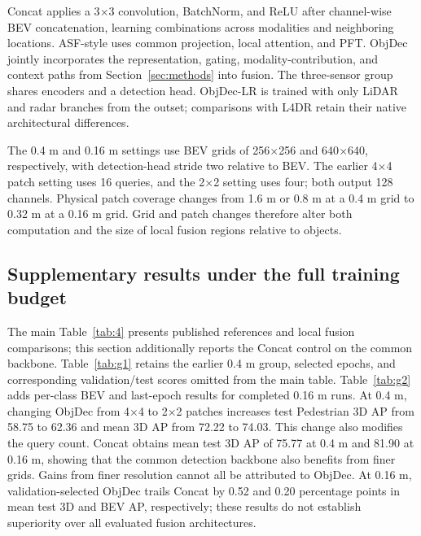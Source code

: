 Concat applies a 3\(\times\)3 convolution, BatchNorm, and ReLU after channel-wise BEV concatenation, learning combinations across modalities and neighboring locations. ASF-style uses common projection, local attention, and PFT. ObjDec jointly incorporates the representation, gating, modality-contribution, and context paths from Section~\ref{sec:methods} into fusion. The three-sensor group shares encoders and a detection head. ObjDec-LR is trained with only LiDAR and radar branches from the outset; comparisons with L4DR retain their native architectural differences.

The 0.4 m and 0.16 m settings use BEV grids of 256\(\times\)256 and 640\(\times\)640, respectively, with detection-head stride two relative to BEV. The earlier 4\(\times\)4 patch setting uses 16 queries, and the 2\(\times\)2 setting uses four; both output 128 channels. Physical patch coverage changes from 1.6 m or 0.8 m at a 0.4 m grid to 0.32 m at a 0.16 m grid. Grid and patch changes therefore alter both computation and the size of local fusion regions relative to objects.

\subsection{Supplementary results under the full training budget}
\label{subsec:g3}

The main Table~\ref{tab:4} presents published references and local fusion comparisons; this section additionally reports the Concat control on the common backbone. Table~\ref{tab:g1} retains the earlier 0.4 m group, selected epochs, and corresponding validation/test scores omitted from the main table. Table~\ref{tab:g2} adds per-class BEV and last-epoch results for completed 0.16 m runs. At 0.4 m, changing ObjDec from 4\(\times\)4 to 2\(\times\)2 patches increases test Pedestrian 3D AP from 58.75 to 62.36 and mean 3D AP from 72.22 to 74.03. This change also modifies the query count. Concat obtains mean test 3D AP of 75.77 at 0.4 m and 81.90 at 0.16 m, showing that the common detection backbone also benefits from finer grids. Gains from finer resolution cannot all be attributed to ObjDec. At 0.16 m, validation-selected ObjDec trails Concat by 0.52 and 0.20 percentage points in mean test 3D and BEV AP, respectively; these results do not establish superiority over all evaluated fusion architectures.

